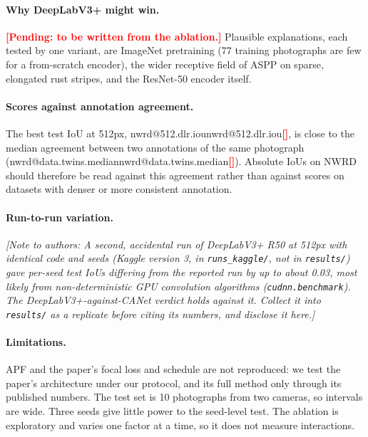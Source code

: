 \documentclass[11pt,a4paper]{article}
\makeatletter
\newcommand{\val}[1]{\ifcsname nwrd@#1\endcsname\csname nwrd@#1\endcsname\else\textcolor{red}{\textbf{[\detokenize{#1}]}}\fi}
\newcommand{\pending}[1]{\textcolor{red}{\textbf{[Pending: #1]}}}
\newcommand{\note}[1]{\textcolor{blue!60!black}{\textit{[Note to authors: #1]}}}
\makeatother
\begin{document}
\paragraph{Why DeepLabV3+ might win.} \pending{to be written from the ablation.} Plausible
explanations, each tested by one variant, are ImageNet pretraining (77 training photographs are
few for a from-scratch encoder), the wider receptive field of ASPP on sparse, elongated rust
stripes, and the ResNet-50 encoder itself.

\paragraph{Scores against annotation agreement.} The best test IoU at 512px,
\val{512.dlr.iou}, is close to the median agreement between two annotations of the same photograph
(\val{data.twins.median}). Absolute IoUs on NWRD should therefore be read against this agreement
rather than against scores on datasets with denser or more consistent annotation.

\paragraph{Run-to-run variation.} \note{A second, accidental run of DeepLabV3+ R50 at 512px with
identical code and seeds (Kaggle version 3, in \texttt{runs\_kaggle/}, not in \texttt{results/})
gave per-seed test IoUs differing from the reported run by up to about 0.03, most likely from
non-deterministic GPU convolution algorithms (\texttt{cudnn.benchmark}). The DeepLabV3+-against-CANet
verdict holds against it. Collect it into \texttt{results/} as a replicate before citing its
numbers, and disclose it here.}

\paragraph{Limitations.} APF and the paper's focal loss and schedule are not reproduced: we test the
paper's architecture under our protocol, and its full method only through its published numbers.
The test set is 10 photographs from two cameras, so intervals are wide. Three seeds give little
power to the seed-level test. The ablation is exploratory and varies one factor at a time, so it
does not measure interactions.

\end{document}
